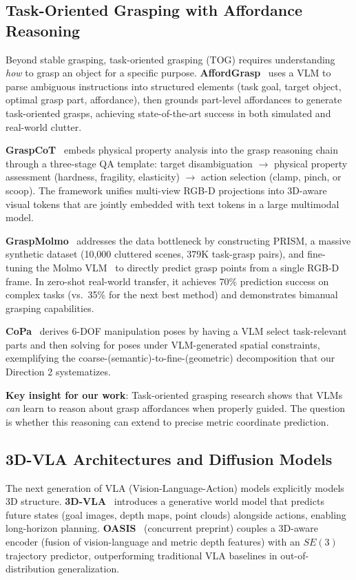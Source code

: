 \documentclass[11pt,a4paper]{article}
\begin{document}
\subsection{Task-Oriented Grasping with Affordance Reasoning}

Beyond stable grasping, task-oriented grasping (TOG) requires understanding \textit{how} to grasp an object for a specific purpose. \textbf{AffordGrasp}~\cite{affordgrasp} uses a VLM to parse ambiguous instructions into structured elements (task goal, target object, optimal grasp part, affordance), then grounds part-level affordances to generate task-oriented grasps, achieving state-of-the-art success in both simulated and real-world clutter.

\textbf{GraspCoT}~\cite{graspcot} embeds physical property analysis into the grasp reasoning chain through a three-stage QA template: target disambiguation $\rightarrow$ physical property assessment (hardness, fragility, elasticity) $\rightarrow$ action selection (clamp, pinch, or scoop). The framework unifies multi-view RGB-D projections into 3D-aware visual tokens that are jointly embedded with text tokens in a large multimodal model.

\textbf{GraspMolmo}~\cite{graspmolmo} addresses the data bottleneck by constructing PRISM, a massive synthetic dataset (10,000 cluttered scenes, 379K task-grasp pairs), and fine-tuning the Molmo VLM~\cite{deitke2025molmo} to directly predict grasp points from a single RGB-D frame. In zero-shot real-world transfer, it achieves 70\% prediction success on complex tasks (vs.\ 35\% for the next best method) and demonstrates bimanual grasping capabilities.

\textbf{CoPa}~\cite{huang2024copa} derives 6-DOF manipulation poses by having a VLM select task-relevant parts and then solving for poses under VLM-generated spatial constraints, exemplifying the coarse-(semantic)-to-fine-(geometric) decomposition that our Direction 2 systematizes.

\textbf{Key insight for our work}: Task-oriented grasping research shows that VLMs \textit{can} learn to reason about grasp affordances when properly guided. The question is whether this reasoning can extend to precise metric coordinate prediction.

\subsection{3D-VLA Architectures and Diffusion Models}

The next generation of VLA (Vision-Language-Action) models explicitly models 3D structure. \textbf{3D-VLA}~\cite{zhen2024threedvla} introduces a generative world model that predicts future states (goal images, depth maps, point clouds) alongside actions, enabling long-horizon planning. \textbf{OASIS}~\cite{oasis} (concurrent preprint) couples a 3D-aware encoder (fusion of vision-language and metric depth features) with an $SE(3)$ trajectory predictor, outperforming traditional VLA baselines in out-of-distribution generalization.
\end{document}
